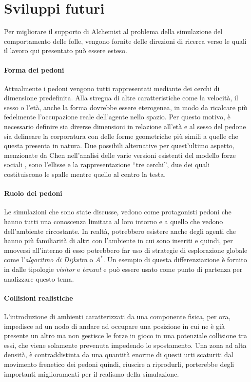 \section{Sviluppi futuri}
Per migliorare il supporto di Alchemist al problema della simulazione del comportamento delle folle, vengono fornite delle direzioni di ricerca verso le quali il lavoro qui presentato può essere esteso.

\paragraph{Forma dei pedoni}
Attualmente i pedoni vengono tutti rappresentati mediante dei cerchi di dimensione predefinita. Alla stregua di altre caratteristiche come la velocità, il sesso o l'età, anche la forma dovrebbe essere eterogenea, in modo da ricalcare più fedelmente l'occupazione reale dell'agente nello spazio. \newline
Per questo motivo, è necessario definire sia diverse dimensioni in relazione all'età e al sesso del pedone sia delineare la corporatura con delle forme geometriche più simili a quelle che questa presenta in natura. Due possibili alternative per quest'ultimo aspetto, menzionate da Chen nell'analisi delle varie versioni esistenti del modello forze sociali \cite{Chen2017}, sono l'ellisse e la rappresentazione \enquote{tre cerchi}, due dei quali costituiscono le spalle mentre quello al centro la testa.

\paragraph{Ruolo dei pedoni}
Le simulazioni che sono state discusse, vedono come protagonisti pedoni che hanno tutti una conoscenza limitata al loro intorno e a quello che vedono dell'ambiente circostante. \newline 
In realtà, potrebbero esistere anche degli agenti che hanno più familiarità di altri con l'ambiente in cui sono inseriti e
quindi, per muoversi all'interno di esso potrebbero far uso di strategie di esplorazione globale come l'\textit{algoritmo di Dijkstra} o $A^{*}$. \newline 
Un esempio di questa differenziazione è fornito in \cite{Tan2019} dalle tipologie \textit{visitor} e \textit{tenant} e può essere usato come punto di partenza per analizzare questo tema.

\paragraph{Collisioni realistiche}
L'introduzione di ambienti caratterizzati da una componente fisica, per ora, impedisce ad un nodo di andare ad occupare una posizione in cui ne è già presente un altro ma non gestisce le forze in gioco in una potenziale collisione tra essi, che viene solamente prevenuta impedendo lo spostamento. \newline
Una zona ad alta densità, è contraddistinta da una quantità enorme di questi urti scaturiti dal movimento frenetico dei pedoni quindi, riuscire a riprodurli, porterebbe degli importanti miglioramenti per il realismo della simulazione.

